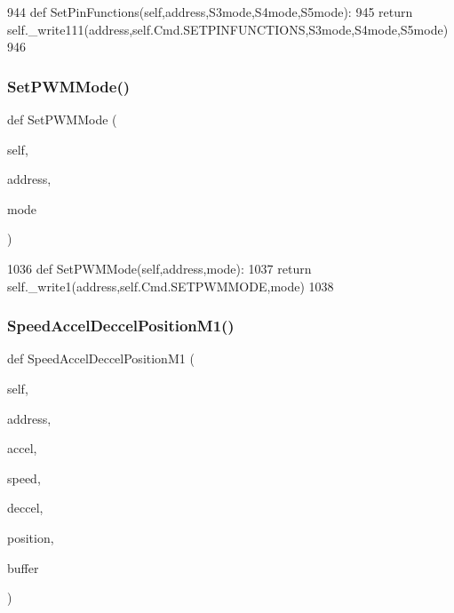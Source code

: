 \begin{DoxyCode}
944     \textcolor{keyword}{def }SetPinFunctions(self,address,S3mode,S4mode,S5mode):
945         \textcolor{keywordflow}{return} self.\_write111(address,self.Cmd.SETPINFUNCTIONS,S3mode,S4mode,S5mode)
946 
\end{DoxyCode}
\mbox{\label{classtoxic__hardware_1_1roboclaw__3_1_1Roboclaw_aadb6c9818880f6971fe75cb9bdaeeac1}} 
\subsubsection{\texorpdfstring{Set\+P\+W\+M\+Mode()}{SetPWMMode()}}
{\footnotesize\ttfamily def Set\+P\+W\+M\+Mode (\begin{DoxyParamCaption}\item[{}]{self,  }\item[{}]{address,  }\item[{}]{mode }\end{DoxyParamCaption})}


\begin{DoxyCode}
1036     \textcolor{keyword}{def }SetPWMMode(self,address,mode):
1037         \textcolor{keywordflow}{return} self.\_write1(address,self.Cmd.SETPWMMODE,mode)
1038 
\end{DoxyCode}
\mbox{\label{classtoxic__hardware_1_1roboclaw__3_1_1Roboclaw_a1b4d92f94801f58a9890c9587bd028af}} 
\subsubsection{\texorpdfstring{Speed\+Accel\+Deccel\+Position\+M1()}{SpeedAccelDeccelPositionM1()}}
{\footnotesize\ttfamily def Speed\+Accel\+Deccel\+Position\+M1 (\begin{DoxyParamCaption}\item[{}]{self,  }\item[{}]{address,  }\item[{}]{accel,  }\item[{}]{speed,  }\item[{}]{deccel,  }\item[{}]{position,  }\item[{}]{buffer }\end{DoxyParamCaption})}


